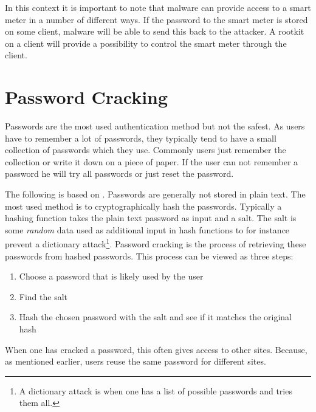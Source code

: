 In this context it is important to note that malware can provide access to a smart meter in a number of different ways.
If the password to the smart meter is stored on some client, malware will be able to send this back to the attacker.
A rootkit on a client will provide a possibility to control the smart meter through the client.

\section{Password Cracking}\label{password_cracking}
Passwords are the most used authentication method but not the safest.
As users have to remember a lot of passwords, they typically tend to have a small collection of passwords which they use.
Commonly users just remember the collection or write it down on a piece of paper.
If the user can not remember a password he will try all passwords or just reset the password.\cite{florencio2007large}\cite{bishop1995improving}\cite{dell2010password}

The following is based on \citet{marechal2008advances}.
Passwords are generally not stored in plain text.
The most used method is to cryptographically hash the passwords.
Typically a hashing function takes the plain text password as input and a salt.
The salt is some \textit{random} data used as additional input in hash functions to for instance prevent a dictionary attack\footnote{A dictionary attack is when one has a list of possible passwords and tries them all.}.
Password cracking is the process of retrieving these passwords from hashed passwords.
This process can be viewed as three steps:
\begin{enumerate}
\item Choose a password that is likely used by the user
\item Find the salt
\item Hash the chosen password with the salt and see if it matches the original hash
\end{enumerate}

When one has cracked a password, this often gives access to other sites.
Because, as mentioned earlier, users reuse the same password for different sites.


